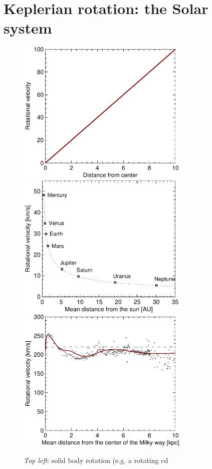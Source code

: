 \section{Keplerian rotation: the Solar system} 
\label{sect:kepler}
\begin{figure}[htbp]
\begin{center}
\includegraphics[width=8.2cm]{../figures/cdrot.pdf}
\includegraphics[width=8.2cm]{../figures/solsystrot.pdf}
\includegraphics[width=8.2cm]{../figures/mwrot.pdf}
\end{center}
\caption{\emph{Top left}: solid body rotation (e.g. a rotating cd
}
\end{figure}
